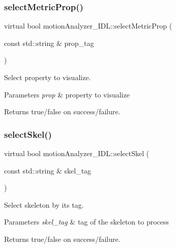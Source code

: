 \subsubsection{\texorpdfstring{selectMetricProp()}{selectMetricProp()}}
{\footnotesize\ttfamily virtual bool motion\+Analyzer\+\_\+\+I\+D\+L\+::select\+Metric\+Prop (\begin{DoxyParamCaption}\item[{const std\+::string \&}]{prop\+\_\+tag }\end{DoxyParamCaption})\hspace{0.3cm}{\ttfamily [virtual]}}



Select property to visualize. 


\begin{DoxyParams}{Parameters}
{\em prop} & property to visualize \\
\hline
\end{DoxyParams}
\begin{DoxyReturn}{Returns}
true/false on success/failure. 
\end{DoxyReturn}
\mbox{\label{classmotionAnalyzer__IDL_a158f8a856611aa5d4bcab9adc9c67a5d}} 
\subsubsection{\texorpdfstring{selectSkel()}{selectSkel()}}
{\footnotesize\ttfamily virtual bool motion\+Analyzer\+\_\+\+I\+D\+L\+::select\+Skel (\begin{DoxyParamCaption}\item[{const std\+::string \&}]{skel\+\_\+tag }\end{DoxyParamCaption})\hspace{0.3cm}{\ttfamily [virtual]}}



Select skeleton by its tag. 


\begin{DoxyParams}{Parameters}
{\em skel\+\_\+tag} & tag of the skeleton to process \\
\hline
\end{DoxyParams}
\begin{DoxyReturn}{Returns}
true/false on success/failure. 
\end{DoxyReturn}
\mbox{\label{classmotionAnalyzer__IDL_a9169bb6dd0ca068bd040bab9d93724ed}} 
